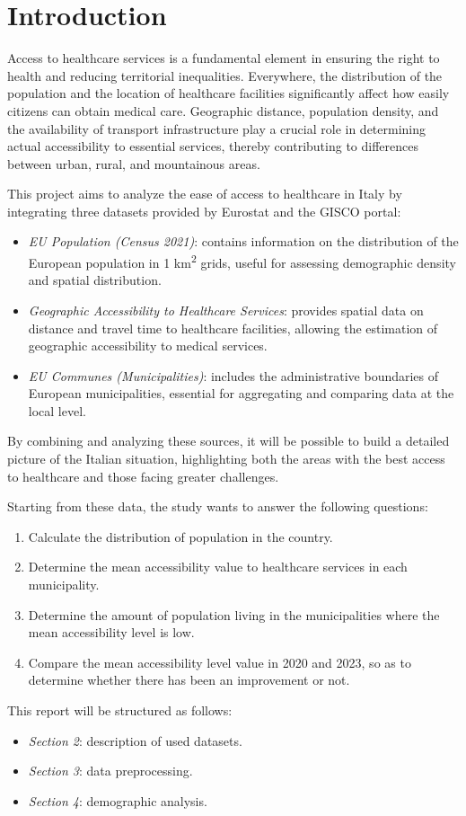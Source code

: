 \section{Introduction}

Access to healthcare services is a fundamental element in ensuring the right to health and reducing territorial inequalities. 
Everywhere, the distribution of the population and the location of healthcare facilities significantly affect how easily citizens can obtain medical care.
Geographic distance, population density, and the availability of transport infrastructure play a crucial role in determining actual accessibility to essential services, thereby contributing to differences between urban, rural, and mountainous areas.

This project aims to analyze the ease of access to healthcare in Italy by integrating three datasets provided by Eurostat and the GISCO portal:

\begin{itemize}
	
	\item \emph{EU Population (Census 2021)}: contains information on the distribution of the European population in 1 km\textsuperscript{2} grids, useful for assessing demographic density and spatial distribution.

	\item \emph{Geographic Accessibility to Healthcare Services}: provides spatial data on distance and travel time to healthcare facilities, allowing the estimation of geographic accessibility to medical services.

	\item \emph{EU Communes (Municipalities)}: includes the administrative boundaries of European municipalities, essential for aggregating and comparing data at the local level.
\end{itemize}

By combining and analyzing these sources, it will be possible to build a detailed picture of the Italian situation, highlighting both the areas with the best access to healthcare and those facing greater challenges.

Starting from these data, the study wants to answer the following questions:
\begin{enumerate}
	\item Calculate the distribution of population in the country.
	\item Determine the mean accessibility value to healthcare services in each municipality.
	\item Determine the amount of population living in the municipalities where the mean accessibility level is low.
	\item Compare the mean accessibility level value in 2020 and 2023, so as to determine whether there has been an improvement or not.
\end{enumerate}

This report will be structured as follows:
\begin{itemize}
	\item \emph{Section 2}: description of used datasets.
	\item \emph{Section 3}: data preprocessing.
	\item \emph{Section 4}: demographic analysis.
\end{itemize}